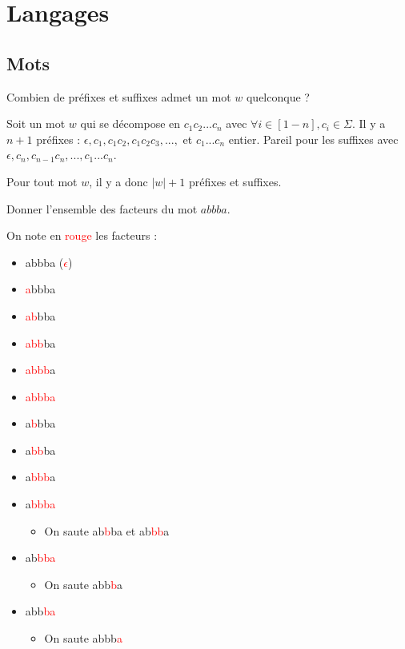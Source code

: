 
\chapter{Langages}
\label{langages}

\section{Mots}


\begin{exercice}
\label{expref}
Combien de préfixes et suffixes admet un mot $w$ quelconque ?
\end{exercice}

\begin{correction*}
Soit un mot $w$ qui se décompose en $c_1c_2...c_n$ avec $\forall i \in [1-n], c_i \in \Sigma$. Il y a $n+1$ préfixes : $\epsilon, c_1, c_1c_2, c_1c_2c_3, ...,$ et $c_1...c_n$ entier. Pareil pour les suffixes avec $\epsilon, c_n, c_{n-1}c_n, ..., c_1...c_n$.

Pour tout mot $w$, il y a donc $|w|+1$ préfixes et suffixes.
\end{correction*}


\begin{exercice}
Donner l'ensemble des facteurs du mot $abbba$.
\end{exercice}

\begin{correction*}
On note en \textcolor{red}{rouge} les facteurs :

\begin{itemize}
\item abbba (\textcolor{red}{$\epsilon$})
\item \textcolor{red}{a}bbba
\item \textcolor{red}{ab}bba
\item \textcolor{red}{abb}ba
\item \textcolor{red}{abbb}a
\item \textcolor{red}{abbba}
\item a\textcolor{red}{b}bba
\item a\textcolor{red}{bb}ba
\item a\textcolor{red}{bbb}a
\item a\textcolor{red}{bbba}
\begin{itemize} \item On saute ab\textcolor{red}{b}ba et ab\textcolor{red}{bb}a \end{itemize}
\item ab\textcolor{red}{bba}
\begin{itemize} \item On saute abb\textcolor{red}{b}a \end{itemize}
\item abb\textcolor{red}{ba}
\begin{itemize} \item On saute abbb\textcolor{red}{a} \end{itemize}
\end{itemize}
\end{correction*}


